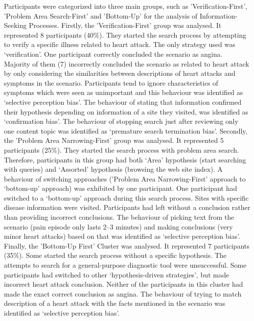 \documentclass[]{article}
\begin{document}
Participants were categorized into three main groups, such as 'Verification-First', 'Problem Area Search-First' and 'Bottom-Up' for the analysis of Information-Seeking Processes. Firstly, the 'Verification-First' group was analysed. It represented 8 participants (40\%). They started the search process by attempting to verify a specific illness related to heart attack. The only strategy used was ‘verification’. One participant correctly concluded the scenario as angina. Majority of them (7) incorrectly concluded the scenario as related to heart attack by only considering the similarities between descriptions of heart attacks and symptoms in the scenario. Participants tend to ignore characteristics of symptoms which were seen as unimportant and this behaviour was identified as ‘selective perception bias’. The behaviour of stating that information confirmed their hypothesis depending on information of a site they visited, was identified as ‘confirmation bias’. The behaviour of stopping search just after reviewing only one content topic was identified as ‘premature search termination bias’. Secondly, the 'Problem Area Narrowing-First' group was analysed. It represented 5 participants (25\%). They started the search process with problem area search. Therefore, participants in this group had both ‘Area’ hypothesis (start searching with queries) and ‘Assorted’ hypothesis (browsing the web site index). A behaviour of switching approaches ('Problem Area Narrowing-First' approach to ‘bottom-up’ approach) was exhibited by one participant. One participant had switched to a ‘bottom-up’ approach during this search process. Sites with specific disease information were visited. Participants had left without a conclusion rather than providing incorrect conclusions. The behaviour of picking text from the scenario (pain episode only lasts 2–3 minutes) and making conclusions (very minor heart attacks) based on that was identified as ‘selective perception bias'. Finally, the 'Bottom-Up First' Cluster was analysed. It represented 7 participants (35\%). Some started the search process without a specific hypothesis. The attempts to search for a general-purpose diagnostic tool were unsuccessful. Some participants had  switched to other ‘hypothesis-driven strategies’, but made incorrect heart attack conclusion. Neither of the participants in this cluster had made the exact correct conclusion as angina. The behaviour of trying to match description of a heart attack with the facts mentioned in the scenario was identified as ‘selective perception bias’.                      
\end{document}
